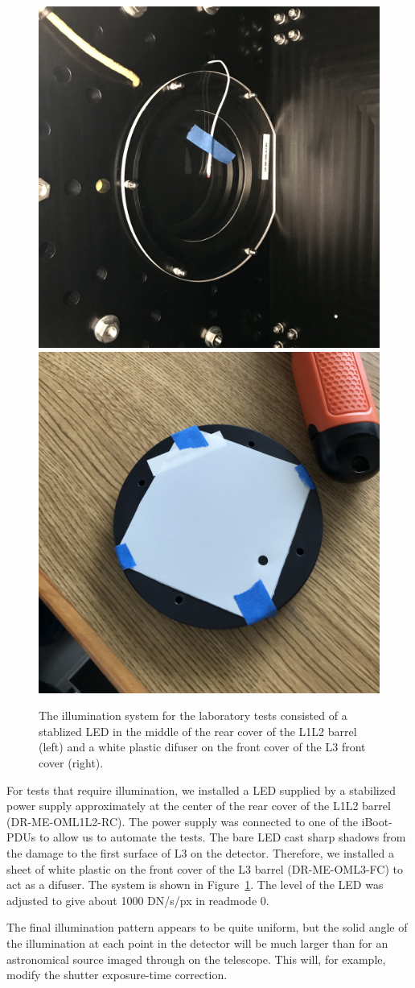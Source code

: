 \documentclass{article}
\begin{document}
\begin{figure}
\begin{center}
\includegraphics[width=0.45\linewidth]{IMG_1296.jpg}
\includegraphics[width=0.45\linewidth]{IMG_1301.jpg}
\end{center}
\caption{The illumination system for the laboratory tests consisted of a stablized LED in the middle of the rear cover of the L1L2 barrel (left) and a white plastic difuser on the front cover of the L3 front cover (right).}
\label{figure:illumination-system}
\end{figure}

For tests that require illumination, we installed a LED supplied by a stabilized power supply approximately at the center of the rear cover of the L1L2 barrel (DR-ME-OML1L2-RC). The power supply was connected to one of the iBoot-PDUs to allow us to automate the tests. The bare LED cast sharp shadows from the damage to the first surface of L3 on the detector. Therefore, we installed a sheet of white plastic on the front cover of the L3 barrel (DR-ME-OML3-FC) to act as a difuser. The system is shown in Figure~\ref{figure:illumination-system}. The level of the LED was adjusted to give about 1000 DN/s/px in readmode 0.

The final illumination pattern appears to be quite uniform, but the solid angle of the illumination at each point in the detector will be much larger than for an astronomical source imaged through on the telescope. This will, for example, modify the shutter exposure-time correction.
\end{document}
